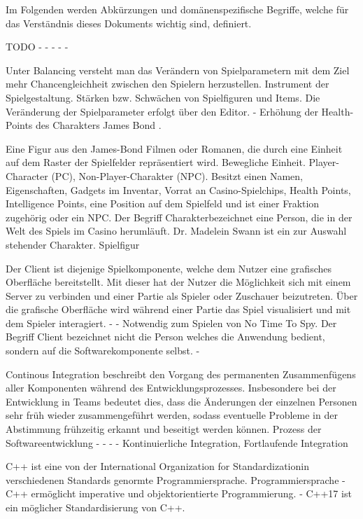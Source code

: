 Im Folgenden werden Abkürzungen und domänenspezifische Begriffe, welche für das Verständnis dieses Dokuments wichtig sind, definiert.


{TODO}
{-}
{-}
{-}
{-}
{-}

{Unter Balancing versteht man das Verändern von Spielparametern mit dem Ziel mehr Chancengleichheit zwischen den Spielern herzustellen.}
{Instrument der Spielgestaltung.}
{Stärken bzw. Schwächen von Spielfiguren und Items.}
{Die Veränderung der Spielparameter erfolgt über den Editor.}
{-}
{Erhöhung der Health-Points des Charakters \glqq James Bond \grqq.}

{Eine Figur aus den James-Bond Filmen oder Romanen, die durch eine Einheit auf dem Raster der Spielfelder repräsentiert wird.}
{Bewegliche Einheit.}
{Player-Character (PC), Non-Player-Charakter (NPC).}
{Besitzt einen Namen, Eigenschaften, Gadgets im Inventar, Vorrat an Casino-Spielchips, Health Points, Intelligence Points, eine Position auf dem Spielfeld und ist einer Fraktion zugehörig oder ein NPC.}
{Der Begriff \glqq Charakter\grqq bezeichnet eine Person, die in der Welt des Spiels im Casino herumläuft.}
{Dr. Madelein Swann ist ein zur Auswahl stehender Charakter.}
{Spielfigur}

{Der Client ist diejenige Spielkomponente, welche dem Nutzer eine grafisches Oberfläche bereitstellt. Mit dieser hat der Nutzer die Möglichkeit sich mit einem Server zu verbinden und einer Partie als Spieler oder Zuschauer beizutreten. Über die grafische Oberfläche wird während einer Partie das Spiel visualisiert und mit dem Spieler interagiert. }
{-}
{-}
{Notwendig zum Spielen von \glqq No Time To Spy\grqq.}
{Der Begriff Client bezeichnet nicht die Person welches die Anwendung bedient, sondern auf die Softwarekomponente selbst.}
{-}

{Continous Integration beschreibt den Vorgang des permanenten Zusammenfügens aller Komponenten während des Entwicklungsprozesses. Insbesondere bei der Entwicklung in Teams bedeutet dies, dass die Änderungen der einzelnen Personen sehr früh wieder zusammengeführt werden, sodass eventuelle Probleme in der Abstimmung frühzeitig erkannt und beseitigt werden können.}
{Prozess der Softwareentwicklung}
{-}
{-}
{-}
{-}
{Kontinuierliche Integration, Fortlaufende Integration}

{C++ ist eine von der \glqq International Organization for Standardization\grqq in verschiedenen Standards genormte Programmiersprache.}
{Programmiersprache}
{-}
{C++ ermöglicht imperative und objektorientierte Programmierung.}
{-}
{C++17 ist ein möglicher Standardisierung von C++.}

